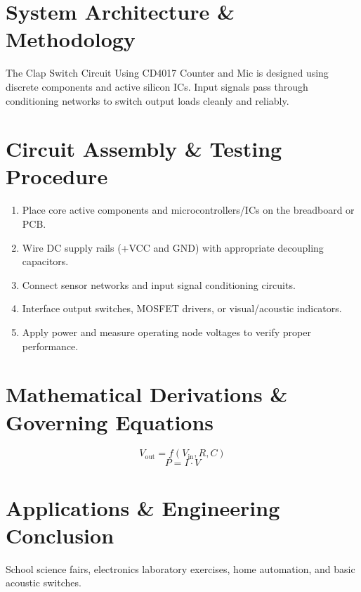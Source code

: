 \documentclass[11pt,a4paper]{article}
\begin{document}
\section{System Architecture \& Methodology}
The Clap Switch Circuit Using CD4017 Counter and Mic is designed using discrete components and active silicon ICs. Input signals pass through conditioning networks to switch output loads cleanly and reliably.

\section{Circuit Assembly \& Testing Procedure}
\begin{enumerate}
    \item Place core active components and microcontrollers/ICs on the breadboard or PCB.
    \item Wire DC supply rails (+VCC and GND) with appropriate decoupling capacitors.
    \item Connect sensor networks and input signal conditioning circuits.
    \item Interface output switches, MOSFET drivers, or visual/acoustic indicators.
    \item Apply power and measure operating node voltages to verify proper performance.
\end{enumerate}

\section{Mathematical Derivations \& Governing Equations}
\begin{equation}
V_{\text{out}} = f(V_{\text{in}}, R, C)
\end{equation}
\begin{equation}
P = I \cdot V
\end{equation}

\section{Applications \& Engineering Conclusion}
School science fairs, electronics laboratory exercises, home automation, and basic acoustic switches.
\end{document}
